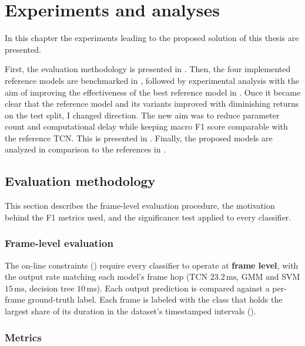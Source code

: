 \chapter{Experiments and analyses}
\label{cap:experiments}

In this chapter the experiments leading to the proposed solution of this thesis are presented.

First, the evaluation methodology is presented in .
Then, the four implemented reference models are benchmarked in , followed by experimental analysis with the aim of improving the effectiveness of the best reference model in .
Once it became clear that the reference model and its variants improved with diminishing returns on the test split, I changed direction.
The new aim was to reduce parameter count and computational delay while keeping macro F1 score comparable with the reference TCN.
This is presented in .
Finally, the proposed models are analyzed in comparison to the references in .

\section{Evaluation methodology}
\label{sec:exp_evaluation}

This section describes the frame-level evaluation procedure, the motivation behind the F1 metrics used, and the significance test applied to every classifier.

\subsection{Frame-level evaluation}
\label{subsec:exp_eval_frame}

The on-line constraints () require every classifier to operate at \textbf{frame level}, with the output rate matching each model's frame hop (TCN $23.2\,\text{ms}$, GMM and SVM $15\,\text{ms}$, decision tree $10\,\text{ms}$).
Each output prediction is compared against a per-frame ground-truth label.
Each frame is labeled with the class that holds the largest share of its duration in the dataset's timestamped intervals ().

\subsection{Metrics}
\label{subsec:exp_eval_metrics}

